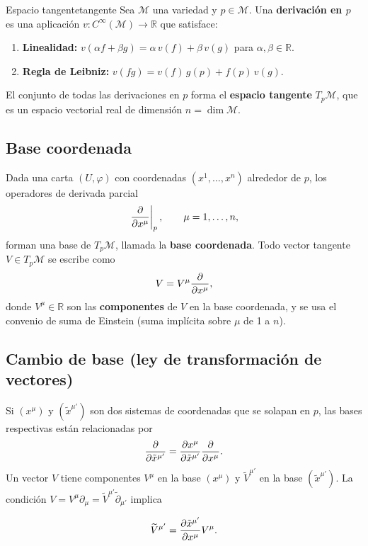 \begin{definicion}{Espacio tangente}{tangente}
Sea $\mathcal{M}$ una variedad y $p \in \mathcal{M}$. Una \textbf{derivación en $p$} es una aplicación $v: C^\infty(\mathcal{M}) \to \mathbb{R}$ que satisface:
\begin{enumerate}[leftmargin=2em]
  \item \textbf{Linealidad:} $v(\alpha f + \beta g) = \alpha\, v(f) + \beta\, v(g)$ para $\alpha, \beta \in \mathbb{R}$.
  \item \textbf{Regla de Leibniz:} $v(fg) = v(f)\, g(p) + f(p)\, v(g)$.
\end{enumerate}
El conjunto de todas las derivaciones en $p$ forma el \textbf{espacio tangente} $T_p\mathcal{M}$, que es un espacio vectorial real de dimensión $n = \dim \mathcal{M}$.
\end{definicion}

\subsection{Base coordenada}

Dada una carta $(U, \varphi)$ con coordenadas $(x^1, \ldots, x^n)$ alrededor de $p$, los operadores de derivada parcial
\[
  \left.\dfrac{\partial }{\partial x^\mu}\right|_p, \qquad \mu = 1, \ldots, n,
\]
forman una base de $T_p\mathcal{M}$, llamada la \textbf{base coordenada}. Todo vector tangente $V \in T_p\mathcal{M}$ se escribe como
\begin{equation}
  V = V^\mu \dfrac{\partial }{\partial x^\mu},
  \label{eq:vector_expansion}
\end{equation}
donde $V^\mu \in \mathbb{R}$ son las \textbf{componentes} de $V$ en la base coordenada, y se usa el convenio de suma de Einstein (suma implícita sobre $\mu$ de 1 a $n$).

\subsection{Cambio de base (ley de transformación de vectores)}

Si $(x^\mu)$ y $(\tilde{x}^{\mu'})$ son dos sistemas de coordenadas que se solapan en $p$, las bases respectivas están relacionadas por
\[
  \dfrac{\partial }{\partial \tilde{x}^{\mu'}} = \dfrac{\partial x^\mu}{\partial \tilde{x}^{\mu'}} \dfrac{\partial }{\partial x^\mu}.
\]
Un vector $V$ tiene componentes $V^\mu$ en la base $(x^\mu)$ y $\widetilde{V}^{\mu'}$ en la base $(\tilde{x}^{\mu'})$. La condición $V = V^\mu \partial_\mu = \widetilde{V}^{\mu'} \tilde{\partial}_{\mu'}$ implica

\begin{equation}
  \widetilde{V}^{\mu'} = \dfrac{\partial \tilde{x}^{\mu'}}{\partial x^\mu} V^\mu.
  \label{eq:trans_vector}
\end{equation}

